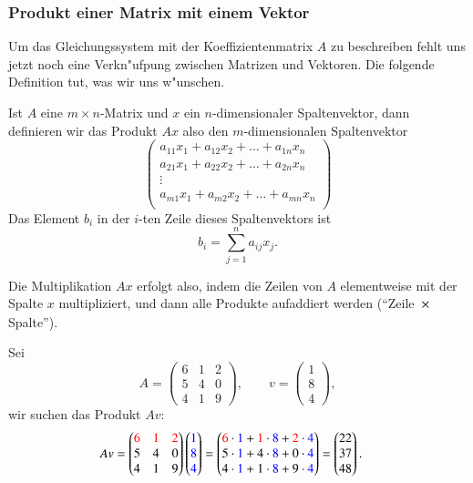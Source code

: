 \subsubsection{Produkt einer Matrix mit einem Vektor}
Um das Gleichungssystem mit der Koeffizientenmatrix $A$ zu beschreiben
fehlt uns jetzt noch eine Verkn"ufpung zwischen Matrizen und
Vektoren.
Die folgende Definition tut, was wir uns w"unschen.
\begin{definition}
Ist $A$ eine $m\times n$-Matrix und $x$ ein $n$-dimensionaler Spaltenvektor,
dann definieren wir das Produkt $Ax$ also den $m$-dimensionalen
Spaltenvektor
\[
\begin{pmatrix}
a_{11}x_1+a_{12}x_2+\dots+a_{1n}x_n\\
a_{21}x_1+a_{22}x_2+\dots+a_{2n}x_n\\
\vdots\\
a_{m1}x_1+a_{m2}x_2+\dots+a_{mn}x_n\\
\end{pmatrix}
\]
Das Element $b_i$ in der $i$-ten Zeile dieses Spaltenvektors ist
\[
b_i=\sum_{j=1}^na_{ij}x_j.
\]
\end{definition}
Die Multiplikation $Ax$ erfolgt also, indem die Zeilen von $A$
elementweise mit der Spalte $x$ multipliziert, und dann alle Produkte
aufaddiert werden (``Zeile $\strut \times\mathstrut$ Spalte'').

\begin{beispiel} Sei
\[
A=\begin{pmatrix}
6&1&2\\
5&4&0\\
4&1&9
\end{pmatrix}
,\qquad
v=
\begin{pmatrix}
1\\8\\4
\end{pmatrix},
\]
wir suchen das Produkt $Av$:
\begin{align*}
Av&=
\begin{pmatrix}
\color{red}6&\color{red}1&\color{red}2\\
5&4&0\\
4&1&9
\end{pmatrix}
\begin{pmatrix}
\color{blue}1\\\color{blue}8\\\color{blue}4
\end{pmatrix}
=
\begin{pmatrix}
{\color{red}6}\cdot{\color{blue}1}+
{\color{red}1}\cdot{\color{blue}8}+
{\color{red}2}\cdot{\color{blue}4}
\\
5\cdot{\color{blue}1}+
4\cdot{\color{blue}8}+
0\cdot{\color{blue}4}
\\
4\cdot{\color{blue}1}+
1\cdot{\color{blue}8}+
9\cdot{\color{blue}4}
\end{pmatrix}
=\begin{pmatrix}
22\\37\\48
\end{pmatrix}.
\end{align*}
\end{beispiel}

